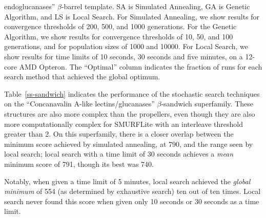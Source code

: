 \documentclass{acm_proc_article-sp}
\begin{document}
\begin{small}
\begin{center}
\begin{table}[htb]
{endoglucanases'' $\beta$-barrel template. 
SA is Simulated Annealing, GA is Genetic Algorithm, and LS is Local Search. 
For Simulated Annealing, we show results for convergence thresholds of
200, 500, and 1000 generations. 
For the Genetic Algorithm, we show results for convergence thresholds of 10, 
50, and 100 generations, and for population sizes of 1000 and 10000.
For Local Search, we show results for time limits of 10 seconds, 30 seconds and 
five minutes, on a 12-core AMD Opteron.
The ``Optimal'' column indicates the fraction of runs for each search method
that achieved the global optimum.}
\end{table}
\end{center}
\end{small}

Table~\ref{ss-sandwich} indicates the performance of the stochastic
search techniques on the ``Concanavalin A-like lectins/glucanases'' 
$\beta$-sandwich superfamily.
These structures are also more complex than the propellers, even though they 
are also more computationally complex for SMURFLite with an interleave 
threshold greater than 2. 
On this superfamily, there is a closer overlap between the minimum score 
achieved by simulated annealing, at 790, and the range seen by local search;
local search with a time limit of 30 seconds achieves a \emph{mean} minimum
score of 791, though its best was 740.

Notably, when given a time limit of 5 minutes, local search achieved the 
\emph{global minimum} of 554 (as determined by exhaustive search) ten out of 
ten times. Local search never found this score when given only 10 seconds or
30 seconds as a time limit.
\end{document}
